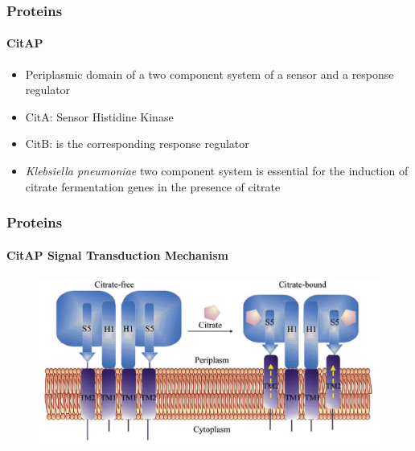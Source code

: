 \documentclass[english]{beamer}
\begin{document}

\begin{frame}
    \frametitle{Proteins}
    \framesubtitle{CitAP}

    \begin{itemize}
        \item Periplasmic domain of a two component system of a sensor and a response regulator
        \item CitA: Sensor Histidine Kinase
        \item CitB: is the corresponding response regulator
        \item \textit{Klebsiella pneumoniae} two component system is essential for the induction of citrate fermentation genes in the presence of citrate
    \end{itemize}
\end{frame} 


\begin{frame}
    \frametitle{Proteins}
    \framesubtitle{CitAP Signal Transduction Mechanism}
    \begin{figure}
        \includegraphics[width=.9\linewidth]{figures/CitA_mechanism.png}
    \end{figure}      

    \tiny


\end{frame}  
 
\end{document}
